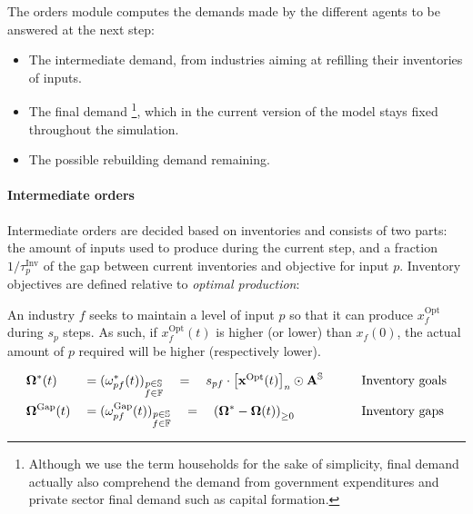 The orders module computes the demands made by the different agents to be
answered at the next step:
\begin{itemize}
\item The intermediate demand, from industries aiming at refilling their
  inventories of inputs.
\item The final demand \footnote{Although we use the term households for the
    sake of simplicity, final demand actually also comprehend the demand from government
    expenditures and private sector final demand such as capital formation.}, which in the current
  version of the model stays fixed throughout the simulation.
\item The possible rebuilding demand remaining.
\end{itemize}


\paragraph{Intermediate orders}
\label{sec:intermediate-orders}

Intermediate orders are decided based on inventories and consists of two parts:
the amount of inputs used to produce during the current step, and a fraction
$1 / \tau^{\textrm{Inv}}_{p}$ of the gap between current inventories and
objective for input $p$.
Inventory objectives are defined relative to \emph{optimal production}:

An industry $f$ seeks to maintain a level of input $p$ so that it can produce
$x^{\textrm{Opt}}_f$  during $s_p$ steps. As such, if $x^{\textrm{Opt}}_f(t)$ is
higher (or lower) than $x_f(0)$, the actual amount of $p$ required will be
higher (respectively lower).

\begin{alignat*}{4}
  &\mathbf{\Omega}^{*}(t) &&= (\omega_{pf}^{*}(t))_{\substack{p \in \mathbb{S}\\f \in \mathbb{F}}} \quad = \quad s_{pf} \cdot \begin{bmatrix} \mathbf{x}^{\textrm{Opt}}(t) \end{bmatrix}_{n} \odot  \mathbf{A}^{\mathbb{S}} && \quad && \text{Inventory goals} \\
  &\mathbf{\Omega}^{\textrm{Gap}}(t) &&= (\omega_{pf}^{\textrm{Gap}}(t))_{\substack{p \in \mathbb{S}\\f \in \mathbb{F}}} \quad = \quad \left ( \mathbf{\Omega}^{*} - \mathbf{\Omega}(t) \right )_{\geq 0} && \quad && \text{Inventory gaps}\\
\end{alignat*}

